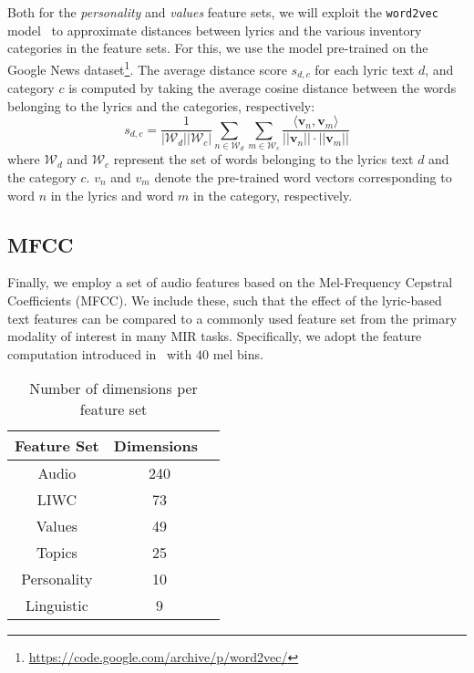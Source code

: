 \documentclass{article}
\begin{document}
Both for the \emph{personality} and \emph{values} feature sets, we will exploit the \texttt{word2vec} model~\cite{DBLP:conf/nips/MikolovSCCD13} to approximate distances between lyrics and the various inventory categories in the feature sets. For this, we use the model pre-trained on the Google News dataset\footnote{\url{https://code.google.com/archive/p/word2vec/}}. 
The average distance score $s_{d,c}$ for each lyric text $d$, and category $c$ is computed by taking the average cosine distance between the words belonging to the lyrics and the categories, respectively:
\begin{equation}
    s_{d, c} = \frac{1}{|\mathcal{W}_d||\mathcal{W}_c|}\sum_{n\in\mathcal{W}_d}\sum_{m\in\mathcal{W}_c} \frac{\langle \mathbf{v}_n, \mathbf{v}_m \rangle}{||\mathbf{v}_n|| \cdot ||\mathbf{v}_m||}
\end{equation}
where $\mathcal{W}_d$ and $\mathcal{W}_c$ represent the set of words belonging to the lyrics text $d$ and the category $c$. $v_n$ and $v_m$ denote the pre-trained word vectors corresponding to word $n$ in the lyrics and word $m$ in the category, respectively.


\subsection{MFCC}\label{sec:featset:mfcc}

Finally, we employ a set of audio features based on the Mel-Frequency Cepstral Coefficients (MFCC). We include these, such that the effect of the lyric-based text features can be compared to a commonly used feature set from the primary modality of interest in many MIR tasks. Specifically, we adopt the feature computation introduced in~\cite{DBLP:conf/ismir/ChoiFSC17} with $40$ mel bins. 

\begin{table}[!tb]
\centering
\begin{tabular}{ccc}
Feature Set & Dimensions\\ \hline
Audio & \ 240   \\
LIWC & \ 73 \\
Values  & \ 49   \\ 
Topics  & \ 25   \\
Personality  & \ 10   \\ 
Linguistic  & \ 9   \\ 
\end{tabular}
\caption{Number of dimensions per feature set}
\label{tab:feat_dim}
\end{table}
\end{document}
